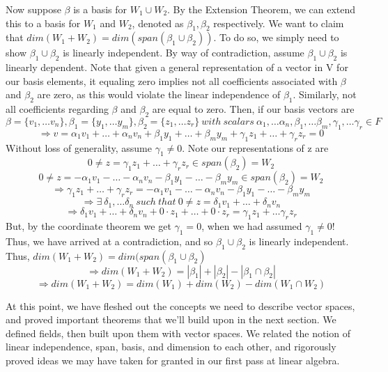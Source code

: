 \documentclass[12pt]{article}
\begin{document}
Now suppose $\beta$ is a basis for $W_1 \cup W_2$. By the Extension Theorem, we can extend this to a basis for $W_1$ and $W_2$, denoted as $\beta_1,\beta_2$ respectively. We want to claim that $dim(W_1 + W_2) = dim(span(\beta_1 \cup \beta_2))$. To do so, we simply need to show $\beta_1 \cup \beta_2$ is linearly independent. By way of contradiction, assume $\beta_1 \cup \beta_2$ is linearly dependent. Note that given a general representation of a vector in V for our basis elements, it equaling zero implies not all coefficients associated with $\beta$ and $\beta_2$ are zero, as this would violate the linear independence of $\beta_1$. Similarly, not all coefficients regarding $\beta$ and $\beta_2$ are equal to zero. Then, if our basis vectors are $$\beta = \{ v_1, \dots v_n \}, \beta_1 = \{ y_1, \dots y_m \}, \beta_2 = \{ z_1, \dots z_r \}\ with\ scalars\ \alpha_1, \dots \alpha_n, \beta_1, \dots \beta_m, \gamma_1, \dots \gamma_r \in F$$
$$\Rightarrow v = \alpha_1 v_1 + \dots + \alpha_n v_n + \beta_1 y_1 + \dots + \beta_m y_m + \gamma_1 z_1 + \dots + \gamma_r z_r = 0$$
Without loss of generality, assume $\gamma_1 \neq 0$. Note our representations of z are
$$0 \neq z = \gamma_1 z_1 + \dots + \gamma_r z_r \in span(\beta_2) = W_2$$
$$0 \neq z = -\alpha_1 v_1 - \dots - \alpha_n v_n - \beta_1 y_1 - \dots - \beta_m y_m \in span(\beta_2) = W_2$$
$$\Rightarrow \gamma_1 z_1 + \dots + \gamma_r z_r = -\alpha_1 v_1 - \dots - \alpha_n v_n - \beta_1 y_1 - \dots - \beta_m y_m$$
$$\Rightarrow \exists\ \delta_1, \dots \delta_n\ such\ that\ 0 \neq z = \delta_1 v_1 + \dots + \delta_n v_n$$
$$\Rightarrow \delta_1 v_1 + \dots + \delta_n v_n + 0 \cdot z_1 + \dots + 0 \cdot z_r = \gamma_1 z_1 + \dots \gamma_r z_r$$
But, by the coordinate theorem we get $\gamma_1 = 0$, when we had assumed $\gamma_1 \neq 0$! Thus, we have arrived at a contradiction, and so $\beta_1 \cup \beta_2$ is linearly independent. Thus, $dim(W_1 + W_2) = dim(span(\beta_1 \cup \beta_2)$
$$ \Rightarrow dim (W_1 + W_2) = |\beta_1| + |\beta_2| - |\beta_1 \cap \beta_2|$$
$$ \Rightarrow dim(W_1 + W_2) = dim(W_1) + dim(W_2) - dim(W_1 \cap W_2)$$

At this point, we have fleshed out the concepts we need to describe vector spaces, and proved important theorems that we'll build upon in the next section. We defined fields, then built upon them with vector spaces. We related the notion of linear independence, span, basis, and dimension to each other, and rigorously proved ideas we may have taken for granted in our first pass at linear algebra.
\clearpage
\end{document}
